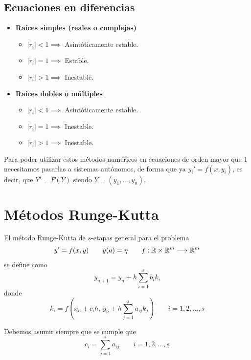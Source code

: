 \subsection*{Ecuaciones en diferencias}
\begin{itemize}
    \item \textbf{Raíces simples (reales o complejas)}
    \begin{itemize}
        \item $|r_i| < 1 \implies$ Asintóticamente estable.
        \item $|r_i| = 1 \implies$ Estable.
        \item $|r_i| > 1 \implies$ Inestable.
    \end{itemize}
    
    \item \textbf{Raíces dobles o múltiples}
    \begin{itemize}
        \item $|r_i| < 1 \implies$ Asintóticamente estable.
        \item $|r_i| = 1 \implies$ Inestable.
        \item $|r_i| > 1 \implies$ Inestable.
    \end{itemize}
\end{itemize}
\begin{obs}
    Para poder utilizar estos m\'etodos num\'ericos en ecuaciones de orden mayor que 1 necesitamos pasarlas a sistemas aut\'onomos, de forma que ya $y_i'=f(x,y_i)$, es decir, que $Y'=F(Y)$ siendo $Y = (y_1, \ldots, y_n)$. 
\end{obs}

\section{M\'etodos Runge-Kutta}
\begin{defi}
    El m\'etodo Runge-Kutta de $s$-etapas general para el problema
    $$y' = f(x,y) \qquad y(a)=\eta \qquad f:\mathbb{R} \times \mathbb{R}^m \longrightarrow \mathbb{R}^m$$
    se define como
    $$y_{n+1} = y_n + h \sum_{i=1}^s b_i k_i$$
    donde 
    $$k_i = f \left( x_n +c_i h, \, y_n + h \sum_{j=1}^s a_{ij} k_j \right)\qquad i=1,2,\ldots, s$$
\end{defi}

Debemos asumir siempre que se cumple que 
$$c_i = \sum_{j=1}^s a_{ij} \qquad i=1,2,\ldots, s$$


